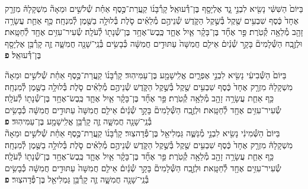\documentclass[twoside, openany, parskip=half, 11pt]{book}
\begin{document}
\begin{footnotesize}
\begin{multicols}{2}

בַּיּוֹם֙ הַשִּׁשִּׁ֔י נָשִׂ֖יא לִבְנֵ֣י גָ֑ד אֶלְיָסָ֖ף בֶּן־דְּ֯עוּאֵֽל׃ קָרְ֯בָּנ֜וֹ קַֽעֲרַת־כֶּ֣סֶף אַחַ֗ת שְׁ֯לֹשִׁ֣ים וּמֵאָה֘ מִשְׁקָלָהּ֒ מִזְרָ֤ק אֶחָד֙ כֶּ֔סֶף שִׁבְעִ֥ים שֶׁ֖קֶל בְּ֯שֶׁ֣קֶל הַקֹּ֑דֶשׁ שְׁ֯נֵיהֶ֣ם מְ֯לֵאִ֗ים סֹ֛לֶת בְּ֯לוּלָ֥ה בַשֶּׁ֖מֶן לְ֯מִנְחָֽה׃ כַּ֥ף אַחַ֛ת עֲשָׂרָ֥ה זָהָ֖ב מְ֯לֵאָ֥ה קְ֯טֹֽרֶת׃ פַּ֣ר אֶחָ֞ד בֶּן־בָּקָ֗ר אַ֧יִל אֶחָ֛ד כֶּֽבֶשׂ־אֶחָ֥ד בֶּן־שְׁ֯נָת֖וֹ לְ֯עֹלָֽה׃ שְׂ֯עִיר־עִזִּ֥ים אֶחָ֖ד לְ֯חַטָּֽאת׃ וּלְזֶ֣בַֽח הַשְּׁ֯לָמִים֘ בָּקָ֣ר שְׁ֯נַ֒יִם֒ אֵילִ֤ם חֲמִשָּׁה֙ עַתּוּדִ֣ים חֲמִשָּׁ֔ה כְּ֯בָשִׂ֥ים בְּ֯נֵֽי־שָׁנָ֖ה חֲמִשָּׁ֑ה זֶ֛ה קָרְ֯בַּ֥ן אֶלְיָסָ֖ף בֶּן־דְּ֯עוּאֵֽל׃ \textbf{פ}


בַּיּוֹם֙ הַשְּׁ֯בִיעִ֔י נָשִׂ֖יא לִבְנֵ֣י אֶפְרָ֑יִם אֱלִֽישָׁמָ֖ע בֶּן־עַמִּיהֽוּד׃ קָרְ֯בָּנ֜וֹ קַֽעֲרַת־כֶּ֣סֶף אַחַ֗ת שְׁ֯לֹשִׁ֣ים וּמֵאָה֘ מִשְׁקָלָהּ֒ מִזְרָ֤ק אֶחָד֙ כֶּ֔סֶף שִׁבְעִ֥ים שֶׁ֖קֶל בְּ֯שֶׁ֣קֶל הַקֹּ֑דֶשׁ שְׁ֯נֵיהֶ֣ם מְ֯לֵאִ֗ים סֹ֛לֶת בְּ֯לוּלָ֥ה בַשֶּׁ֖מֶן לְ֯מִנְחָֽה׃ כַּ֥ף אַחַ֛ת עֲשָׂרָ֥ה זָהָ֖ב מְ֯לֵאָ֥ה קְ֯טֹֽרֶת׃  פַּ֣ר אֶחָ֞ד בֶּן־בָּקָ֗ר אַ֧יִל אֶחָ֛ד כֶּֽבֶשׂ־אֶחָ֥ד בֶּן־שְׁ֯נָת֖וֹ לְ֯עֹלָֽה׃ שְׂ֯עִיר־עִזִּ֥ים אֶחָ֖ד לְ֯חַטָּֽאת׃ וּלְזֶ֣בַֽח הַשְּׁ֯לָמִים֘ בָּקָ֣ר שְׁ֯נַ֒יִם֒ אֵילִ֤ם חֲמִשָּׁה֙ עַתּוּדִ֣ים חֲמִשָּׁ֔ה כְּ֯בָשִׂ֥ים בְּ֯נֵֽי־שָׁנָ֖ה חֲמִשָּׁ֑ה זֶ֛ה קָרְ֯בַּ֥ן אֱלִֽישָׁמָ֖ע בֶּן־עַמִּיהֽוּד׃ \textbf{פ}
 \\
 בַּיּוֹם֙ הַשְּׁ֯מִינִ֔י נָשִׂ֖יא לִבְנֵ֣י מְ֯נַשֶּׁ֑ה גַּמְלִיאֵ֖ל בֶּן־פְּ֯דָהצֽוּר׃ קָרְ֯בָּנ֜וֹ קַֽעֲרַת־כֶּ֣סֶף אַחַ֗ת שְׁ֯לֹשִׁ֣ים וּמֵאָה֘ מִשְׁקָלָהּ֒ מִזְרָ֤ק אֶחָד֙ כֶּ֔סֶף שִׁבְעִ֥ים שֶׁ֖קֶל בְּ֯שֶׁ֣קֶל הַקֹּ֑דֶשׁ שְׁ֯נֵיהֶ֣ם מְ֯לֵאִ֗ים סֹ֛לֶת בְּ֯לוּלָ֥ה בַשֶּׁ֖מֶן לְ֯מִנְחָֽה׃ כַּ֥ף אַחַ֛ת עֲשָׂרָ֥ה זָהָ֖ב מְ֯לֵאָ֥ה קְ֯טֹֽרֶת׃ פַּ֣ר אֶחָ֞ד בֶּן־בָּקָ֗ר אַ֧יִל אֶחָ֛ד כֶּֽבֶשׂ־אֶחָ֥ד בֶּן־שְׁ֯נָת֖וֹ לְ֯עֹלָֽה׃ שְׂ֯עִיר־עִזִּ֥ים אֶחָ֖ד לְ֯חַטָּֽאת׃ וּלְזֶ֣בַֽח הַשְּׁ֯לָמִים֘ בָּקָ֣ר שְׁ֯נַ֒יִם֒ אֵילִ֤ם חֲמִשָּׁה֙ עַתּוּדִ֣ים חֲמִשָּׁ֔ה כְּ֯בָשִׂ֥ים בְּ֯נֵֽי־שָׁנָ֖ה חֲמִשָּׁ֑ה זֶ֛ה קָרְ֯בַּ֥ן גַּמְלִיאֵ֖ל בֶּן־פְּ֯דָהצֽוּר׃ \textbf{פ}



\end{multicols}
\end{footnotesize}
\end{document}
